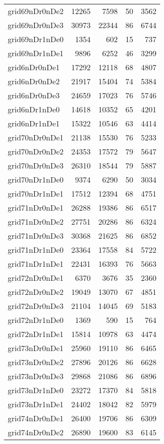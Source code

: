 \begin{longtable}{lrrrr}
grid69nDr0nDe2 & 12265 & 7598 & 50 & 3562 \\
grid69nDr0nDe3 & 30973 & 22344 & 86 & 6744 \\
grid69nDr1nDe0 & 1354 & 602 & 15 & 737 \\
grid69nDr1nDe1 & 9896 & 6252 & 46 & 3299 \\
grid6nDr0nDe1 & 17292 & 12118 & 68 & 4807 \\
grid6nDr0nDe2 & 21917 & 15404 & 74 & 5384 \\
grid6nDr0nDe3 & 24659 & 17023 & 76 & 5746 \\
grid6nDr1nDe0 & 14618 & 10352 & 65 & 4201 \\
grid6nDr1nDe1 & 15322 & 10546 & 63 & 4414 \\
grid70nDr0nDe1 & 21138 & 15530 & 76 & 5233 \\
grid70nDr0nDe2 & 24353 & 17572 & 79 & 5647 \\
grid70nDr0nDe3 & 26310 & 18544 & 79 & 5887 \\
grid70nDr1nDe0 & 9374 & 6290 & 50 & 3034 \\
grid70nDr1nDe1 & 17512 & 12394 & 68 & 4751 \\
grid71nDr0nDe1 & 26288 & 19386 & 86 & 6517 \\
grid71nDr0nDe2 & 27751 & 20286 & 86 & 6324 \\
grid71nDr0nDe3 & 30368 & 21625 & 86 & 6852 \\
grid71nDr1nDe0 & 23364 & 17558 & 84 & 5722 \\
grid71nDr1nDe1 & 22431 & 16393 & 76 & 5663 \\
grid72nDr0nDe1 & 6370 & 3676 & 35 & 2360 \\
grid72nDr0nDe2 & 19049 & 13070 & 67 & 4851 \\
grid72nDr0nDe3 & 21104 & 14045 & 69 & 5183 \\
grid72nDr1nDe0 & 1369 & 590 & 15 & 764 \\
grid72nDr1nDe1 & 15814 & 10978 & 63 & 4474 \\
grid73nDr0nDe1 & 25960 & 19110 & 86 & 6465 \\
grid73nDr0nDe2 & 27896 & 20126 & 86 & 6628 \\
grid73nDr0nDe3 & 29868 & 21086 & 86 & 6896 \\
grid73nDr1nDe0 & 23272 & 17370 & 84 & 5818 \\
grid73nDr1nDe1 & 24402 & 18042 & 82 & 5979 \\
grid74nDr0nDe1 & 26400 & 19706 & 86 & 6309 \\
grid74nDr0nDe2 & 26890 & 19600 & 83 & 6145 \\

\end{longtable}
